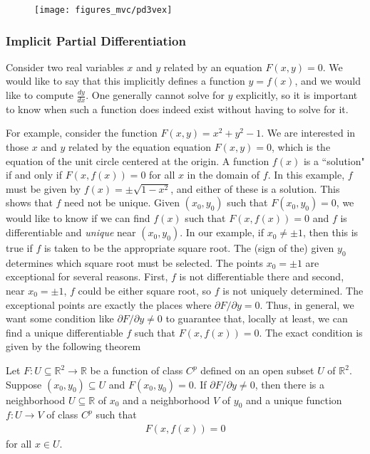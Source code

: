 \documentclass[12pt,letterpaper,reqno]{article}
\numberwithin{equation}{section}
\newcommand{\R}{\ensuremath{\mathbb R}}
\begin{document}
{\begin{figure}[h]
	\begin{center}
		\texttt{[image: figures\_mvc/pd3vex]}
	\end{center}
\end{figure}

\subsubsection{Implicit Partial Differentiation}
Consider two real variables $x$ and $y$ related by an equation $F(x,y)=0$. We would like to say that this implicitly defines a function $y=f(x)$, and we would like to compute $\frac{dy}{dx}$. One generally cannot solve for $y$ explicitly, so it is important to know when such a function does indeed exist without having to solve for it.


For example, consider the function $F(x,y)=x^2+y^2-1$. We are interested in those $x$ and $y$ related by the equation equation $F(x,y)=0$, which is the equation of the unit circle centered at the origin. A function $f(x)$ is a ``solution" if and only if $F(x,f(x))=0$ for all $x$ in the domain of $f$. In this example, $f$ must be given by $f(x)=\pm \sqrt{1-x^2}$, and either of these is a solution. This shows that $f$ need not be unique. Given $(x_0,y_0)$ such that $F(x_0,y_0)=0$, we would like to know if we can find $f(x)$ such that $F(x,f(x))=0$ and $f$ is differentiable and \emph{unique} near $(x_0,y_0)$. In our example, if $x_0 \neq \pm 1$, then this is true if $f$ is taken to be the appropriate square root. The (sign of the) given $y_0$ determines which square root must be selected. The points $x_0=\pm 1$ are exceptional for several reasons. First, $f$ is not differentiable there and second, near $x_0=\pm 1$, $f$ could be either square root, so $f$ is not uniquely determined. The exceptional points are exactly the places where $\partial F/\partial y=0$. Thus, in general, we want some condition like $\partial F/\partial y \neq 0$ to guarantee that, locally at least, we can find a unique differentiable $f$ such that $F(x,f(x))=0$. The exact condition is given by the following theorem

\begin{thm}\label{thm:implicit_function_thm}
	Let $F:U \subseteq \R^2 \to \R$ be a function of class $C^p$ defined on an open subset $U$ of $\R^2$. Suppose $(x_0,y_0) \subseteq U$ and $F(x_0,y_0)=0$. If $\partial F/\partial y \neq 0$, then there is a neighborhood $U \subseteq \R$ of $x_0$ and a neighborhood $V$ of $y_0$ and a unique function $f:U \to V$ of class $C^p$ such that 
	\begin{align*}
		F(x,f(x))=0
	\end{align*}
	for all $x \in U$. 
\end{thm}

}
\end{document}
